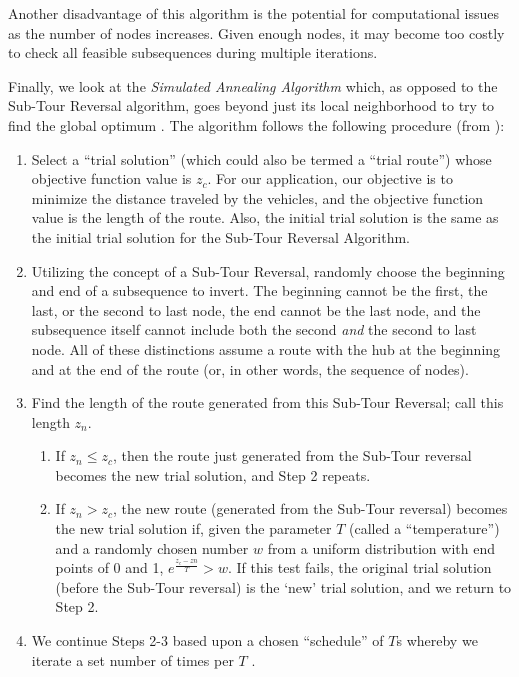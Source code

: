 \documentclass[11pt]{article}
\begin{document}
\noindent Another disadvantage of this algorithm is the potential for computational issues as the number of nodes increases.  Given enough nodes, it may become too costly to check all feasible subsequences during multiple iterations. %

Finally, we look at the \textit{Simulated Annealing Algorithm} which, as opposed to the Sub-Tour Reversal algorithm, goes beyond just its local neighborhood to try to find the global optimum \cite{LPOR_textbook,osman1993metastrategy,usc_subtour}.  The algorithm follows the following procedure (from \cite{LPOR_textbook}):

\begin{enumerate}

\item Select a ``trial solution'' (which could also be termed a ``trial route'') whose objective function value is $z_{c}$.  For our application, our objective is to minimize the distance traveled by the vehicles, and the objective function value is the length of the route.  Also, the initial trial solution is the same as the initial trial solution for the Sub-Tour Reversal Algorithm.

\item  Utilizing the concept of a Sub-Tour Reversal, randomly choose the beginning and end of a subsequence to invert.  The beginning cannot be the first, the last, or the second to last node, the end cannot be the last node, and the subsequence itself cannot include both the second \textit{and} the second to last node.  All of these distinctions assume a route with the hub at the beginning and at the end of the route (or, in other words, the sequence of nodes).  %

\item Find the length of the route generated from this Sub-Tour Reversal; call this length $z_{n}$.  

\begin{enumerate}

\item If $z_{n} \leq z_{c}$, then the route just generated from the Sub-Tour reversal becomes the new trial solution, and Step 2 repeats.

\item If $z_{n} > z_{c}$, the new route (generated from the Sub-Tour reversal) becomes the new trial solution if, given the parameter $T$ (called a ``temperature'') and a randomly chosen number $w$ from a uniform distribution with end points of 0 and 1, $e^{\frac{z_{c} - z{n}}{T}} > w$.  If this test fails, the original trial solution (before the Sub-Tour reversal) is the `new' trial solution, and we return to Step 2. %

\end{enumerate}

\item We continue Steps 2-3 based upon a chosen ``schedule'' of $T$s whereby we iterate a set number of times per $T$ \cite{LPOR_textbook}.

\end{enumerate}
\end{document}
